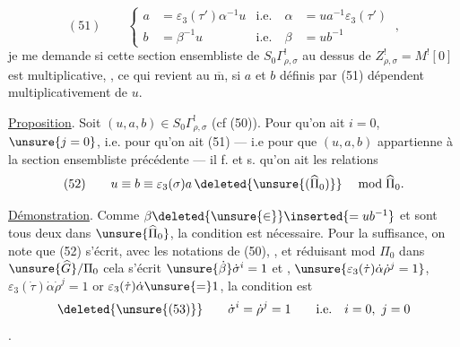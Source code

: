 \[
(51)\qquad
\left\{\begin{aligned}
a&=\varepsilon_3(\tau')\alpha^{-1}u
&\text{i.e.}\quad \alpha&=ua^{-1}\varepsilon_3(\tau')\\
b&=\beta^{-1}u
&\text{i.e.}\quad \beta&=ub^{-1}
\end{aligned}\right.\ ,
\]
je me demande si cette section ensembliste de
$S_0\Gamma_{\rho,\sigma}^{!}$ au dessus de
$Z_{\rho,\sigma}^{!}=M^{!}[0]$ est multiplicative,
, ce qui revient au $\overline{\mathrm m}$,
si $a$ et $b$ définis par (51) dépendent multiplicativement de
 $u$.

\uline{Proposition}. Soit $(u,a,b)\in S_0\Gamma_{\rho,\sigma}^{!}$
(cf (50)). Pour qu'on ait $i=0$, $\unsure{j=0}$, i.e. pour qu'on
ait (51) --- i.e pour que $(u,a,b)$ 
appartienne à la section ensembliste précédente --- il f. et s.
qu'on ait les relations
\[
(52)\qquad u\equiv b\equiv\varepsilon_3(\sigma)a\,
\deleted{\unsure{(\widehat\Pi_0)}}\quad\bmod\widehat\Pi_0.
\]


\uline{Démonstration}. Comme
$\beta\deleted{\unsure{\in}}\inserted{=ub^{-1}}$ et
sont tous deux dans $\unsure{\widehat\Pi_0}$, la condition est
nécessaire. Pour la suffisance, on note que (52) s'écrit, avec les
notations de (50),
,
et réduisant mod $\Pi_0$ dans $\unsure{\widehat G}/\Pi_0$
cela s'écrit $\unsure{\dot\beta}\dot\sigma^{i}=1$ et
,
$\unsure{\varepsilon_3(\dot\tau)\dot\alpha\dot\rho^{j}=1}$,
$\varepsilon_3(\dot\tau)\dot\alpha\dot\rho^{j}=1$
or $\varepsilon_3(\dot\tau)\dot\alpha\unsure{=}1$,
la condition est
\[
\deleted{\unsure{(53)}}\qquad
\dot\sigma^{i}=\dot\rho^{j}=1\qquad\text{i.e.}\quad i=0,\ j=0
\]
.

